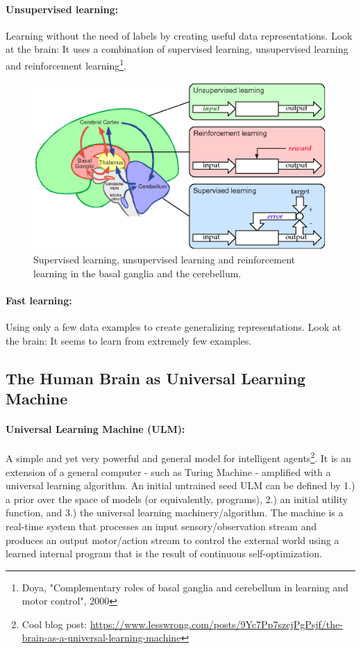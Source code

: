 \documentclass[main]{subfiles}
\begin{document}
\paragraph{Unsupervised learning:}
Learning without the need of labels by creating useful data representations. Look at the brain: It uses a combination of supervised learning, unsupervised learning and reinforcement learning\footnote{Doya, "Complementary roles of basal ganglia and cerebellum in learning and motor control", 2000}.
\begin{figure}[h]
    \centering
    \includegraphics[width=0.5\linewidth]{01_Introduction/figures/basalandcerebellum.png}
    \caption{Supervised learning, unsupervised learning and reinforcement learning in the basal ganglia and the cerebellum.}
    \label{fig:basalandcerebellum}
\end{figure}


\paragraph{Fast learning:} 
Using only a few data examples to create generalizing representations. Look at the brain: It seems to learn from extremely few examples.

\subsection{The Human Brain as Universal Learning Machine}

\paragraph{Universal Learning Machine (ULM):} A simple and yet very powerful and general model for intelligent agents\footnote{Cool blog post: \url{https://www.lesswrong.com/posts/9Yc7Pp7szcjPgPsjf/the-brain-as-a-universal-learning-machine}}. It is an extension of a general computer - such as Turing Machine - amplified with a universal learning algorithm. An initial untrained seed ULM can be defined by 1.) a prior over the space of models (or equivalently, programs), 2.) an initial utility function, and 3.) the universal learning machinery/algorithm.  The machine is a real-time system that processes an input sensory/observation stream and produces an output motor/action stream to control the external world using a learned internal program that is the result of continuous self-optimization. 
\end{document}
